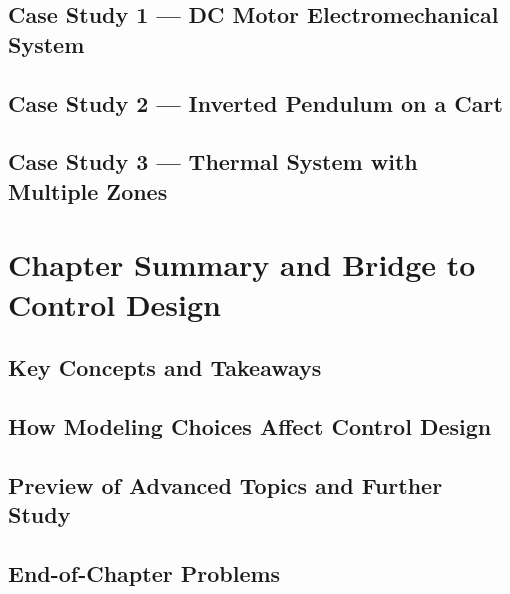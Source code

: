 \documentclass[11pt,letterpaper]{article}
\begin{document}
\subsection{Case Study 1 --- DC Motor Electromechanical System}
\label{sec:case_dc_motor}



\subsection{Case Study 2 --- Inverted Pendulum on a Cart}
\label{sec:case_pendulum}



\subsection{Case Study 3 --- Thermal System with Multiple Zones}
\label{sec:case_thermal}



\section{Chapter Summary and Bridge to Control Design}
\label{sec:chapter_summary}

\subsection{Key Concepts and Takeaways}
\label{sec:key_concepts}



\subsection{How Modeling Choices Affect Control Design}
\label{sec:modeling_choices}



\subsection{Preview of Advanced Topics and Further Study}
\label{sec:advanced_topics}



\subsection{End-of-Chapter Problems}
\label{sec:problems}


\end{document}
